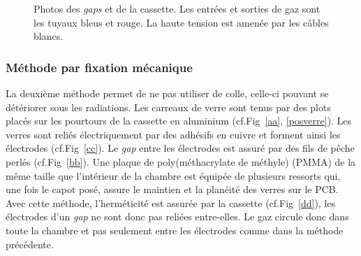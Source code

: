 \begin{figure}[ht!]
\begin{minipage}[t]{.45\textwidth}
    \end{minipage}
 	\caption{Photos des \textit{gaps} et de la cassette. Les entrées et sorties de gaz sont les tuyaux bleus et rouge. La haute tension est amenée par les câbles blancs.}
 	\label{colle}
 \end{figure}
 
 \subsubsection{Méthode par fixation mécanique}
 La deuxième méthode permet de ne pas utiliser de colle, celle-ci pouvant se détériorer sous les radiations. Les carreaux de verre sont tenus par des plots placés sur les pourtours de la cassette en aluminium (cf.Fig~\ref{aa}, \ref{posverre}). Les verres sont reliés électriquement par des adhésifs en cuivre et forment ainsi les électrodes (cf.Fig~\ref{cc}). Le \textit{gap} entre les électrodes est assuré par des fils de pêche perlés (cf.Fig~\ref{bb}). Une plaque de poly(méthacrylate de méthyle) (PMMA) de la même taille que l'intérieur de la chambre est équipée de plusieurs ressorts qui, une fois le capot posé, assure le maintien et la planéité des verres sur le PCB.  Avec cette méthode, l'herméticité est assurée par la cassette (cf.Fig~\ref{dd}), les électrodes d'un \textit{gap} ne sont donc pas reliées entre-elles. Le gaz circule donc dans toute la chambre et pas seulement entre les électrodes comme dans la méthode précédente.
 
